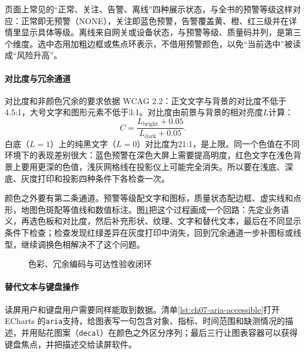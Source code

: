 页面上常见的“正常、关注、告警、离线”四种展示状态，与全书的预警等级这样对应：正常即无预警（NONE），关注即蓝色预警，告警覆盖黄、橙、红三级并在详情里显示具体等级。离线来自网关或设备状态，与预警等级、质量码并列，是第三个维度。选中态用加粗边框或焦点环表示，不借用预警颜色，以免“当前选中”被读成“风险升高”。

\paragraph{对比度与冗余通道}对比度和非颜色冗余的要求依据 WCAG 2.2\cite{wcag22}：正文文字与背景的对比度不低于4.5:1，大号文字和图形元素不低于3:1。对比度由前景与背景的相对亮度$L$计算：
\[
  C=\frac{L_{\mathrm{bright}}+0.05}{L_{\mathrm{dark}}+0.05}.
\]
白底（$L=1$）上的纯黑文字（$L=0$）对比度为21:1，是上限。同一个色值在不同环境下的表现差别很大：蓝色预警在深色大屏上需要提高明度，红色文字在浅色背景上要用更深的色值，浅灰网格线在投影仪上可能完全消失。所以要在浅底、深底、灰度打印和投影四种条件下各检查一次。

颜色之外要有第二条通道。预警等级配文字和图标，质量状态配边框、虚实线和点形，地图色斑配等值线和数值标注。图\ref{fig:ch7-color-accessibility}把这个过程画成一个回路：先定业务语义，再选色板和对比度，然后补充形状、纹理、文字和替代文本，最后在不同显示条件下检查；检查发现红绿差异在灰度打印中消失，回到冗余通道一步补图标或线型，继续调换色相解决不了这个问题。

\begin{figure}[htbp]
\centering
{}
\caption{色彩、冗余编码与可达性验收闭环}
\label{fig:ch7-color-accessibility}
\end{figure}

\paragraph{替代文本与键盘操作}读屏用户和键盘用户需要同样能取到数据。清单\ref{lst:ch07-aria-accessible}打开 ECharts 的\texttt{aria}支持，给图表写一句包含对象、指标、时间范围和缺测情况的描述，并用贴花图案（\texttt{decal}）在颜色之外区分序列；最后三行让图表容器可以获得键盘焦点，并把描述交给读屏软件。

